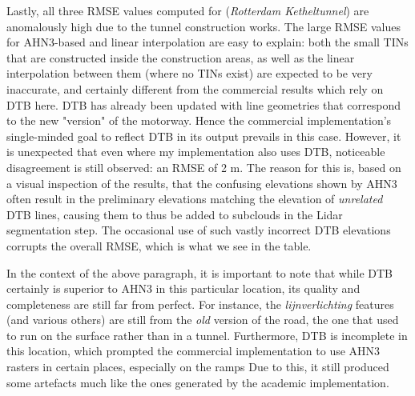Lastly, all three RMSE values computed for  (\textit{Rotterdam Ketheltunnel}) are anomalously high due to the tunnel construction works. The large RMSE values for AHN3-based and linear interpolation are easy to explain: both the small TINs that are constructed inside the construction areas, as well as the linear interpolation between them (where no TINs exist) are expected to be very inaccurate, and certainly different from the commercial results which rely on DTB here. DTB has already been updated with line geometries that correspond to the new "version" of the motorway. Hence the commercial implementation's single-minded goal to reflect DTB in its output prevails in this case. However, it is unexpected that even where my implementation also uses DTB, noticeable disagreement is still observed: an RMSE of 2 m. The reason for this is, based on a visual inspection of the results, that the confusing elevations shown by AHN3 often result in the preliminary elevations matching the elevation of \textit{unrelated} DTB lines, causing them to thus be added to subclouds in the Lidar segmentation step. The occasional use of such vastly incorrect DTB elevations corrupts the overall RMSE, which is what we see in the table.

In the context of the above paragraph, it is important to note that while DTB certainly is superior to AHN3 in this particular location, its quality and completeness are still far from perfect. For instance, the \textit{lijnverlichting} features (and various others) are still from the \textit{old} version of the road, the one that used to run on the surface rather than in a tunnel. Furthermore, DTB is incomplete in this location, which prompted the commercial implementation to use AHN3 rasters in certain places, especially on the ramps Due to this, it still produced some artefacts much like the ones generated by the academic implementation.